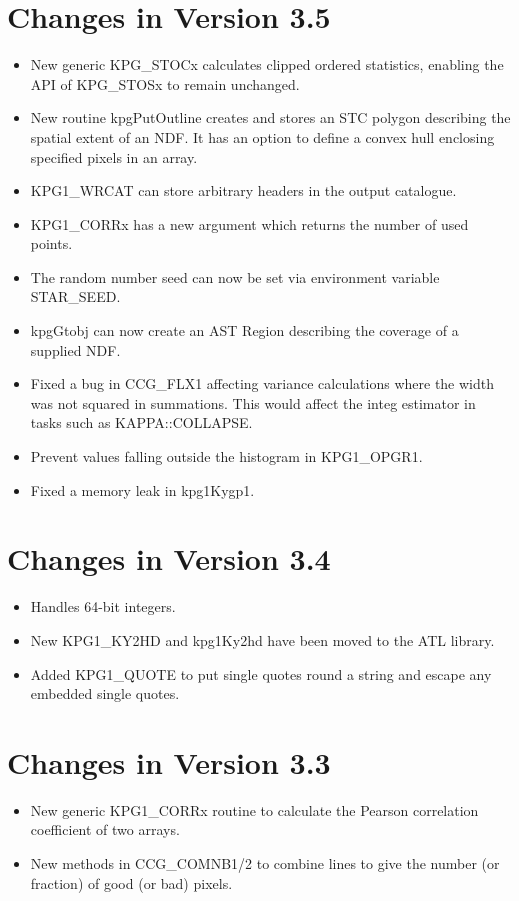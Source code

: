 \documentclass[11pt]{starlink}
\begin{document}
\section{Changes in Version 3.5}
\begin{itemize}
\item New generic KPG\_STOCx calculates clipped ordered statistics,
      enabling the API of KPG\_STOSx to remain unchanged.
\item New routine kpgPutOutline creates and stores an STC polygon
      describing the spatial extent of an NDF.  It has an option to
      define a convex hull enclosing specified pixels in an array.
\item KPG1\_WRCAT can store arbitrary headers in the output catalogue.
\item KPG1\_CORRx has a new argument which returns the number of used
      points.
\item The random number seed can now be set via environment variable
      STAR\_SEED.
\item kpgGtobj can now create an AST Region describing the coverage of
      a supplied NDF.
\item Fixed a bug in CCG\_FLX1 affecting variance calculations where the
      width was not squared in summations.  This would affect the integ
      estimator in tasks such as KAPPA::COLLAPSE.
\item Prevent values falling outside the histogram in KPG1\_OPGR1.
\item Fixed a memory leak in kpg1Kygp1.
\end{itemize}


\section{Changes in Version 3.4}
\begin{itemize}
\item Handles 64-bit integers.
\item New KPG1\_KY2HD and kpg1Ky2hd have been moved to the ATL library.
\item Added KPG1\_QUOTE to put single quotes round a string and escape any
      embedded single quotes.
\end{itemize}


\section{Changes in Version 3.3}
\begin{itemize}
\item New generic KPG1\_CORRx routine to calculate the Pearson correlation
      coefficient of two arrays.
\item New methods in CCG\_COMNB1/2 to combine lines to give the number (or
      fraction) of good (or bad) pixels.
\end{itemize}
\end{document}
